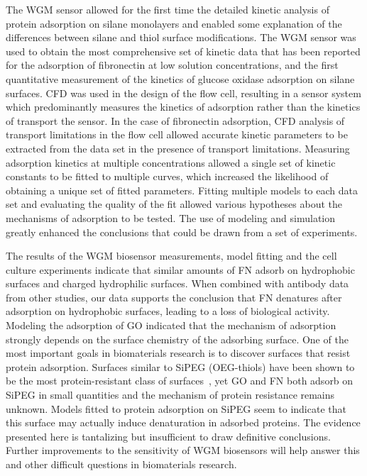 The WGM sensor allowed for the first time the detailed kinetic analysis
of protein adsorption on silane monolayers and enabled some explanation
of the differences between silane and thiol surface modifications.
The WGM sensor was used to obtain the most comprehensive set of kinetic
data that has been reported for the adsorption of fibronectin at low
solution concentrations, and the first quantitative measurement of
the kinetics of glucose oxidase adsorption on silane surfaces. CFD
was used in the design of the flow cell, resulting in a sensor system
which predominantly measures the kinetics of adsorption rather than
the kinetics of transport the sensor. In the case of fibronectin adsorption,
CFD analysis of transport limitations in the flow cell allowed accurate
kinetic parameters to be extracted from the data set in the presence
of transport limitations. Measuring adsorption kinetics at multiple
concentrations allowed a single set of kinetic constants to be fitted
to multiple curves, which increased the likelihood of obtaining a
unique set of fitted parameters. Fitting multiple models to each data
set and evaluating the quality of the fit allowed various hypotheses
about the mechanisms of adsorption to be tested. The use of modeling
and simulation greatly enhanced the conclusions that could be drawn
from a set of experiments.

The results of the WGM biosensor measurements, model fitting and the
cell culture experiments indicate that similar amounts of FN adsorb
on hydrophobic surfaces and charged hydrophilic surfaces. When combined
with antibody data from other studies, our data supports the conclusion
that FN denatures after adsorption on hydrophobic surfaces, leading
to a loss of biological activity. Modeling the adsorption of GO indicated
that the mechanism of adsorption strongly depends on the surface chemistry
of the adsorbing surface. One of the most important goals in biomaterials
research is to discover surfaces that resist protein adsorption. Surfaces
similar to SiPEG (OEG-thiols) have been shown to be the most protein-resistant
class of surfaces~\cite{Ostuni2001}, yet GO and FN both adsorb on
SiPEG in small quantities and the mechanism of protein resistance
remains unknown. Models fitted to protein adsorption on SiPEG seem
to indicate that this surface may actually induce denaturation in
adsorbed proteins. The evidence presented here is tantalizing but
insufficient to draw definitive conclusions. Further improvements
to the sensitivity of WGM biosensors will help answer this and other
difficult questions in biomaterials research.

